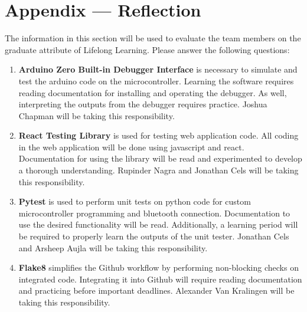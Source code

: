 \documentclass[12pt, titlepage]{article}
\begin{document}
\newpage

\section*{Appendix --- Reflection}

The information in this section will be used to evaluate the team members on the
graduate attribute of Lifelong Learning.  Please answer the following questions:

\begin{enumerate}
  \item \textbf{Arduino Zero Built-in Debugger Interface} is 
  necessary to simulate and test the arduino code on the microcontroller. 
  Learning the software requires reading documentation for installing 
  and operating the debugger. As well, interpreting the outputs from 
  the debugger requires practice. Joshua Chapman will be taking this
  responsibility.
  \item \textbf{React Testing Library} is used for testing web 
  application code. All coding in the web application will be done 
  using javascript and react. Documentation for using the library will be read
  and experimented to develop a thorough understanding.
   Rupinder Nagra and Jonathan Cels will be taking this responsibility. 
  \item \textbf{Pytest} is used to perform unit tests on python code
  for custom microcontroller programming and bluetooth connection. Documentation to 
  use the desired functionality will be read. Additionally, a learning period will 
  be required to properly learn the outputs of the unit tester. 
  Jonathan Cels and Arsheep Aujla will be taking this responsibility.
  \item \textbf{Flake8} simplifies the Github workflow by performing non-blocking 
  checks on integrated code. Integrating it into Github will require reading 
  documentation and practicing before important deadlines. Alexander Van Kralingen 
  will be taking this responsibility.
\end{enumerate}
\end{document}
